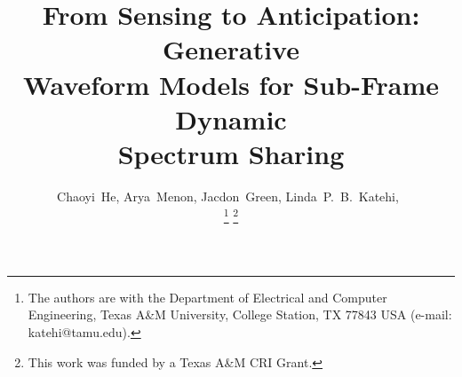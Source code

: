 \documentclass[lettersize,journal]{IEEEtran}
\begin{document}
\title{From Sensing to Anticipation: Generative   \\
Waveform Models for Sub-Frame Dynamic \\
Spectrum Sharing}

\author{Chaoyi~He,
        Arya~Menon,
        Jacdon~Green,
        Linda~P.~B.~Katehi,~%

\thanks{The authors are with the Department of Electrical and Computer
Engineering, Texas A\&M University, College Station, TX 77843 USA
(e-mail: katehi@tamu.edu).}
\thanks{This work was funded by a Texas A\&M CRI Grant.}}


\maketitle
\end{document}
